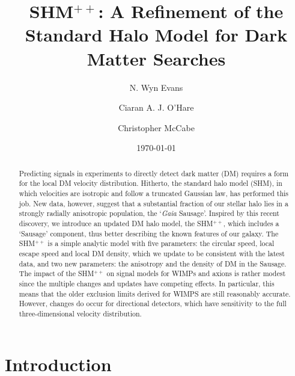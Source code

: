 \documentclass[prd,10pt,twocolumn,showpacs,nofootinbib, aps,superscriptaddress,preprintnumbers]{revtex4-1}
\begin{document}
\title{SHM$^{++}$: A Refinement of the Standard Halo Model for Dark
  Matter Searches}

\author{N. Wyn Evans}  

\author{Ciaran A. J. O'Hare} 

\author{Christopher McCabe} 
  

\date{\today}
\smallskip
\begin{abstract}
%
Predicting signals in experiments to directly detect dark matter (DM)
requires a form for the local DM velocity distribution.  Hitherto, the
standard halo model (SHM), in which velocities are isotropic and
follow a truncated Gaussian law, has performed this job.  New data,
however, suggest that a substantial fraction of our stellar halo lies
in a strongly radially anisotropic population, the `\emph{Gaia}
Sausage'.  Inspired by this recent discovery, we introduce an updated
DM halo model, the SHM$^{++}$, which includes a `Sausage' component,
thus better describing the known features of our galaxy.  The
SHM$^{++}$ is a simple analytic model with five parameters: the
circular speed, local escape speed and local DM density, which we
update to be consistent with the latest data, and two new parameters:
the anisotropy and the density of DM in the Sausage.  The impact of
the SHM$^{++}$ on signal models for WIMPs and axions is rather modest
since the multiple changes and updates have competing effects.  In
particular, this means that the older exclusion limits derived for
WIMPS are still reasonably accurate.  However, changes do occur for
directional detectors, which have sensitivity to the full
three-dimensional velocity distribution.
\end{abstract}

\maketitle

\section{Introduction}
\end{document}
